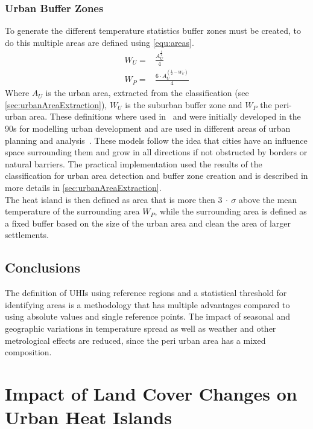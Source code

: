 \documentclass[12pt,a4paper, english,twoside]{scrartcl}
\begin{document}
    \subsubsection{Urban Buffer Zones}\label{sec:urbanBufferzone}
      To generate the different temperature statistics buffer zones must be created, to do this multiple areas are defined using \cref{equ:areas}.
      \begin{equation}\label{equ:areas}
        \begin{split}
          W_U = & \frac{A_U^{\frac{1}{2}}}{4} \\
          W_P = & \frac{6\cdot A_U^{(\frac{1}{2}-W_U)}}{4}
        \end{split}
      \end{equation}
      Where $A_U$ is the urban area, extracted from the classification (see \cref{sec:urbanAreaExtraction}), $W_U$ is the suburban buffer zone and $W_P$ the peri-urban area.
      These definitions where used in~\cite{Sobrino2020} and were initially developed in the 90s for modelling urban development and are used in different areas of urban planning and analysis~\autocite[see]{AlkanBala2014}.
      These models follow the idea that cities have an influence space surrounding them and grow in all directions if not obstructed by borders or natural barriers. 
      The practical implementation used the results of the classification for urban area detection and buffer zone creation and is described in more details in \cref{sec:urbanAreaExtraction}. \\
      The heat island is then defined as area that is more then $3~\cdot~\sigma$ above the mean temperature of the surrounding area $W_P$, while the surrounding area is defined as a fixed buffer based on the size of the urban area and clean the area of larger settlements. 
    \subsection{Conclusions}
    The definition of \glspl{UHI} using reference regions and a statistical threshold for identifying areas is a methodology that has multiple advantages compared to using absolute values and single reference points. 
    The impact of seasonal and geographic variations in temperature spread as well as weather and other metrological effects are reduced, since the peri urban area has a mixed composition. 
\newpage
\section{Impact of Land Cover Changes on Urban Heat Islands}\label{sec:LULC}
\end{document}

